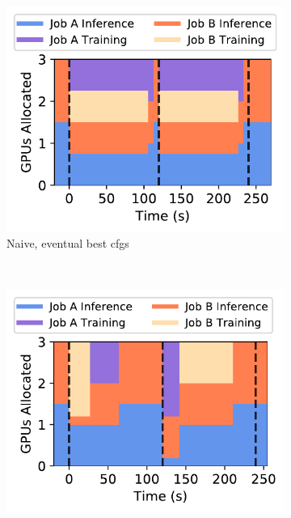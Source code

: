 \begin{figure}[t]
  \centering
  \begin{subfigure}[t]{0.5\columnwidth}
    \centering
    \includegraphics[width=\linewidth]{figures/motivation/Scheduler/schedmot_res_eventual_best_cfgs.pdf}
    \caption{Naive, eventual best cfgs}
    \label{fig:schedmot-res-naive}
  \end{subfigure}  
  ~~
  \begin{subfigure}[t]{0.5\columnwidth}
    \centering
    \includegraphics[width=\linewidth]{figures/motivation/Scheduler/schedmot_res_prioritization_and_optimal_cfgs.pdf}

\end{subfigure}
\end{figure}
